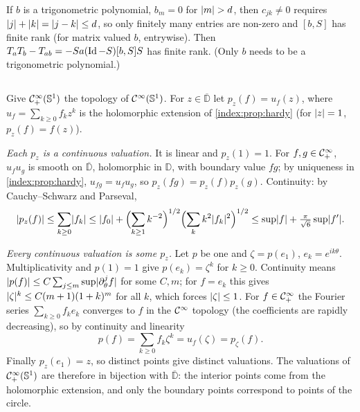 If $b$ is a trigonometric polynomial, $b_m=0$ for $\lvert m\rvert>d$, then $c_{jk}\ne0$
requires $\lvert j\rvert+\lvert k\rvert=\lvert j-k\rvert\le d$, so only finitely many entries are non-zero
and $[b,S]$ has finite rank (for matrix valued $b$, entrywise). Then
$T_aT_b-T_{ab}=-Sa(\operatorname{Id}-S)[b,S]S$ has finite rank. (Only $b$ needs to be a
trigonometric polynomial.)

\subsection*{}
Give $\mathcal{C}^\infty_{+}(\mathbb{S}^1)$ the topology of $\mathcal{C}^\infty(\mathbb{S}^1)$. For
$z\in\overline{\mathbb D}$ let $p_z(f)=u_f(z)$, where $u_f=\sum_{k\ge0}f_kz^k$ is the
holomorphic extension of \cref{index:prop:hardy} (for $\lvert z\rvert=1$, $p_z(f)=f(z)$).

\emph{Each $p_z$ is a continuous valuation.} It is linear and $p_z(1)=1$. For
$f,g\in\mathcal{C}^\infty_{+}$, $u_fu_g$ is smooth on $\overline{\mathbb D}$, holomorphic in
$\mathbb D$, with boundary value $fg$; by uniqueness in \cref{index:prop:hardy},
$u_{fg}=u_fu_g$, so $p_z(fg)=p_z(f)p_z(g)$. Continuity: by Cauchy--Schwarz and
Parseval,
\begin{equation*}
  \lvert p_z(f)\rvert\le\sum_{k\ge0}\lvert f_k\rvert\le\lvert f_0\rvert+\Bigl(\sum_{k\ge1}k^{-2}\Bigr)^{1/2}
  \Bigl(\sum_kk^2\lvert f_k\rvert^2\Bigr)^{1/2}\le\sup\lvert f\rvert+\tfrac{\pi}{\sqrt6}\sup\lvert f'\rvert .
\end{equation*}

\emph{Every continuous valuation is some $p_z$.} Let $p$ be one and $\zeta=p(e_1)$,
$e_k=e^{ik\theta}$. Multiplicativity and $p(1)=1$ give $p(e_k)=\zeta^k$ for $k\ge0$.
Continuity means $\lvert p(f)\rvert\le C\sum_{j\le m}\sup\lvert \partial_\theta^jf\rvert$ for some $C,m$;
for $f=e_k$ this gives $\lvert \zeta\rvert^k\le C(m+1)(1+k)^m$ for all $k$, which forces
$\lvert \zeta\rvert\le1$. For $f\in\mathcal{C}^\infty_{+}$ the Fourier series $\sum_{k\ge0}f_ke_k$ converges to
$f$ in the $\mathcal{C}^\infty$ topology (the coefficients are rapidly decreasing), so by continuity
and linearity
\begin{equation*}
  p(f)=\sum_{k\ge0}f_k\zeta^k=u_f(\zeta)=p_\zeta(f).
\end{equation*}
Finally $p_z(e_1)=z$, so distinct points give distinct valuations. The valuations of
$\mathcal{C}^\infty_{+}(\mathbb{S}^1)$ are therefore in bijection with $\overline{\mathbb D}$: the interior
points come from the holomorphic extension, and only the boundary points correspond to
points of the circle.

